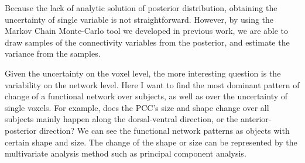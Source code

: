 \documentclass[12pt]{article}
\begin{document}
Because the lack of analytic solution of posterior distribution, obtaining the
uncertainty of single variable is not straightforward. However, by using the
Markov Chain Monte-Carlo tool we developed in previous work, we are able to
draw samples of the connectivity variables from the posterior, and estimate the
variance from the samples. 

Given the uncertainty on the voxel level, the more interesting question is the
variability on the network level. Here I want to find the most dominant pattern
of  change of a functional network over subjects, as well as over the
uncertainty of single voxels. For example, does the PCC's size and shape change
over all subjects mainly happen along the dorsal-ventral direction, or the
anterior-posterior direction? We can see the functional network patterns as
objects with certain shape and size. The change of the shape or size can be
represented by the multivariate analysis method such as principal component
analysis.




\end{document}
